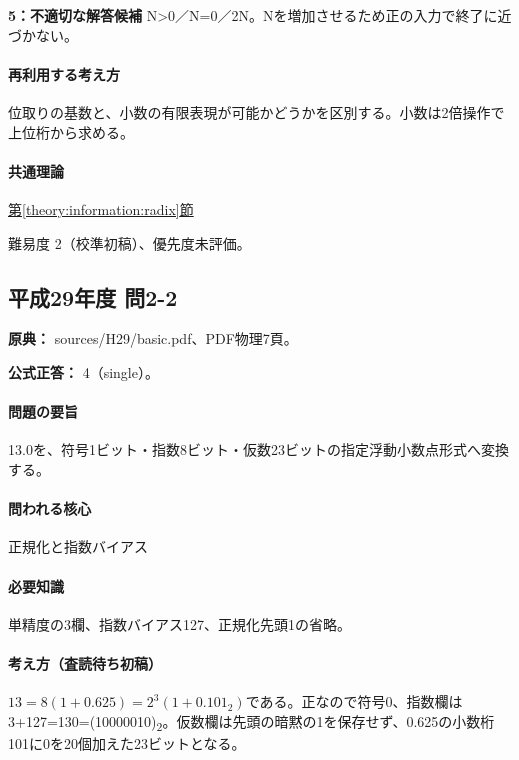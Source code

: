 \noindent\textbf{5：不適切な解答候補} N>0／N=\allowbreak{}0／2N。Nを増加させるため正の入力で終了に近づかない。\par

\paragraph{再利用する考え方} 位取りの基数と、小数の有限表現が可能かどうかを区別する。小数は2倍操作で上位桁から求める。

\paragraph{共通理論} \hyperref[theory:information:radix]{第\ref*{theory:information:radix}節}

\par 難易度 2（校準初稿）、優先度未評価。

\subsection{平成29年度 問2-2}
\label{q:h29-reg-basic-2-2}

\noindent\textbf{原典：} sources/H29/basic.pdf、PDF物理7頁。

\textbf{公式正答：} 4（single）。

\paragraph{問題の要旨} 13.0を、符号1ビット・指数8ビット・仮数23ビットの指定浮動小数点形式へ変換する。

\paragraph{問われる核心} 正規化と指数バイアス

\paragraph{必要知識} 単精度の3欄、指数バイアス127、正規化先頭1の省略。

\paragraph{考え方（査読待ち初稿）} \(13=8(1+0.625)=2^3(1+0.101_2)\)である。正なので符号0、指数欄は3+127=\allowbreak{}130=\allowbreak{}(10000010)\textsubscript{2}。仮数欄は先頭の暗黙の1を保存せず、0.625の小数桁101に0を20個加えた23ビットとなる。

